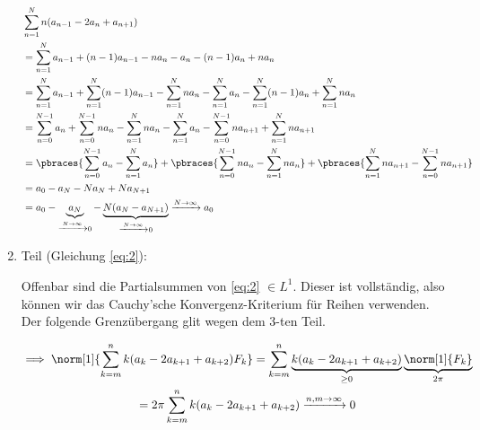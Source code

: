 \begin{solution}
\begin{enumerate}[label = \arabic*.]
    \begin{align*}
        &
        \sum_{n=1}^N n (a_{n-1} - 2 a_n + a_{n+1}) \\
        & =
        \sum_{n=1}^N a_{n-1} + (n-1) a_{n-1} - n a_n - a_n - (n-1) a_n + n a_n \\
        & =
        \sum_{n=1}^N a_{n-1}
        +
        \sum_{n=1}^N (n-1) a_{n-1}
        -
        \sum_{n=1}^N n a_n
        -
        \sum_{n=1}^N a_n
        -
        \sum_{n=1}^N (n-1) a_n
        +
        \sum_{n=1}^N n a_n \\
        & =
        \sum_{n=0}^{N-1} a_n
        +
        \sum_{n=0}^{N-1} n a_n
        -
        \sum_{n=1}^N n a_n
        -
        \sum_{n=1}^N a_n
        -
        \sum_{n=0}^{N-1} n a_{n+1}
        +
        \sum_{n=1}^N n a_{n+1} \\
        & =
        \pbraces
        {
            \sum_{n=0}^{N-1} a_n
            -
            \sum_{n=1}^N a_n
        }
        +
        \pbraces
        {
            \sum_{n=0}^{N-1} n a_n
            -
            \sum_{n=1}^N n a_n
        }
        +
        \pbraces
        {
            \sum_{n=1}^N n a_{n+1}
            -
            \sum_{n=0}^{N-1} n a_{n+1}
        } \\
        & =
        a_0 - a_N - N a_N + N a_{N+1} \\
        & =
        a_0
        -
        \underbrace{a_N}_{\xrightarrow{N \to \infty} 0}
        -
        \underbrace{N (a_N - a_{N+1})}_{\xrightarrow{N \to \infty} 0}
        \xrightarrow{N \to \infty}
        a_0
    \end{align*}

    \item Teil (Gleichung \eqref{eq:2}):
    
    Offenbar sind die Partialsummen von \eqref{eq:2} $\in L^1$.
    Dieser ist vollständig, also können wir das Cauchy'sche Konvergenz-Kriterium für Reihen verwenden.
    Der folgende Grenzübergang glit wegen dem $3$-ten Teil.


    \begin{multline*}
        \implies
        \norm[1]
        {
            \sum_{k=m}^n
            k (a_k - 2 a_{k+1} + a_{k+2})
            F_k
        }
        =
        \sum_{k=m}^n
        \underbrace{k (a_k - 2 a_{k+1} + a_{k+2})}_{\geq 0}
        \underbrace
        {
            \norm[1]{F_k}
        }_{2 \pi} \\
        =
        2 \pi
        \sum_{k=m}^n
        k (a_k - 2 a_{k+1} + a_{k+2})
        \xrightarrow{n, m \to \infty}
        0
    \end{multline*}


\end{enumerate}
\end{solution}
